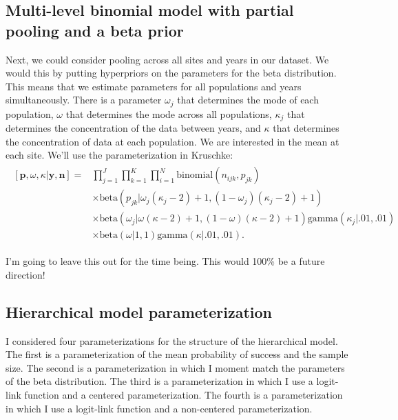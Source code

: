 \documentclass[12pt, oneside, titlepage]{article}   	%
\begin{document}
\subsection*{Multi-level binomial model with partial pooling and a beta prior}

Next, we could consider pooling across all sites and years in our dataset. We would this by putting hyperpriors on the parameters for the beta distribution. This means that we estimate parameters for all populations and years simultaneously. There is a parameter $\omega_j$ that determines the mode of each population, $\omega$ that determines the mode across all populations, $\kappa_j$ that determines the concentration of the data between years, and $\kappa$ that determines the concentration of data at each population. We are interested in the mean at each site. We'll use the parameterization in Kruschke:
%
\begin{align}
  \begin{split}
[\bm{p},\omega,\kappa|\bm{y},\bm{n}]  = & \prod_{j=1}^J \prod_{k=1}^K \prod_{i=1}^N \mathrm{binomial}(n_{ijk},p_{jk}) 
    \\ & \times \mathrm{beta} (  p_{jk} | \omega_j(\kappa_j-2) +1 , (1-\omega_j) (\kappa_j -2) + 1) 
    \\ & \times \mathrm{beta} ( \omega_j |  \omega(\kappa-2) +1 , (1-\omega) (\kappa -2) + 1) \mathrm{gamma} ( \kappa_j | .01, .01) 
    \\ & \times \mathrm{beta} ( \omega | 1 , 1 )  \mathrm{gamma} ( \kappa | .01, .01)  .
  \end{split}
\end{align}

I'm going to leave this out for the time being. This would 100\% be a future direction!
\fi

\subsection*{Hierarchical model parameterization}

I considered four parameterizations for the structure of the hierarchical model. The first is a parameterization of the mean probability of success and the sample size. The second is a parameterization in which I moment match the parameters of the beta distribution. The third is a parameterization in which I use a logit-link function and a centered parameterization. The fourth is a parameterization in which I use a logit-link function and a non-centered parameterization. 
\end{document}
